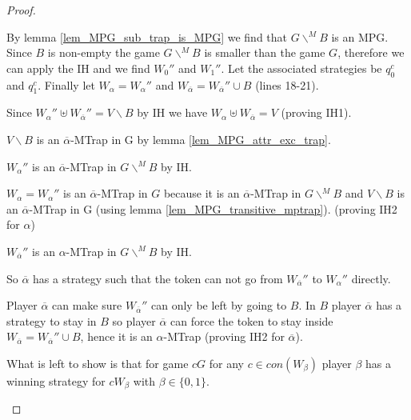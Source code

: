 \begin{theorem}
\begin{proof}
\begin{itemize}
			By lemma \ref{lem_MPG_sub_trap_is_MPG} we find that $G\backslash^{\!\!M}B$ is an MPG. Since $B$ is non-empty the game $G\backslash^{\!\!M}B$ is smaller than the game $G$, therefore we can apply the IH and we find $W_0''$ and $W_1''$. Let the associated strategies be $q_0^c$ and $q_1^c$. Finally let $W_\alpha = W_\alpha''$ and $W_{\overline{\alpha}} = W_{\overline{\alpha}}'' \cup B$ (lines 18-21).
			
			Since $W_\alpha'' \uplus W_{\overline{\alpha}}'' = V\backslash B$ by IH we have $W_\alpha \uplus W_{\overline{\alpha}} = V$ (proving IH1).
			
			
			$V \backslash B$ is an $\overline{\alpha}$-MTrap in G by lemma \ref{lem_MPG_attr_exc_trap}.
			
			$W_\alpha''$ is an $\overline{\alpha}$-MTrap in $G\backslash^{\!\!M}B$ by IH.
			
			$W_\alpha = W_\alpha''$ is an $\overline{\alpha}$-MTrap in $G$ because it is an $\overline{\alpha}$-MTrap in $G\backslash^{\!\!M}B$ and $V \backslash B$ is an $\overline{\alpha}$-MTrap in G (using lemma \ref{lem_MPG_transitive_mptrap}). (proving IH2 for $\alpha$)
			
			$W_{\overline{\alpha}}''$ is an $\alpha$-MTrap in $G\backslash^{\!\!M}B$ by IH.
			
			So $\overline{\alpha}$ has a strategy such that the token can not go from $W_{\overline{\alpha}}''$ to $W_\alpha''$ directly.
			
			Player $\overline{\alpha}$ can make sure $W_{\overline{\alpha}}''$ can only be left by going to $B$. In $B$ player $\overline{\alpha}$ has a strategy to stay in $B$ so player $\overline{\alpha}$ can force the token to stay inside $W_{\overline{\alpha}} = W_{\overline{\alpha}}'' \cup B$, hence it is an $\alpha$-MTrap (proving IH2 for $\overline{\alpha}$).
			
			What is left to show is that for game $cG$ for any $c \in con(W_\beta)$ player $\beta$ has a winning strategy for $cW_\beta$ with $\beta \in \{0,1\}$.
			

\end{itemize}
\end{proof}
\end{theorem}
